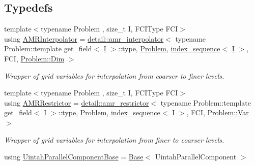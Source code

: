 \subsection*{Typedefs}
\begin{DoxyCompactItemize}
\item 
{\footnotesize template$<$typename Problem , size\+\_\+t I, F\+C\+I\+Type F\+CI$>$ }\\using \hyperlink{namespaceUintah_1_1PhaseField_a2188fd3571014276c1445391573d263d}{A\+M\+R\+Interpolator} = \hyperlink{classUintah_1_1PhaseField_1_1detail_1_1amr__interpolator}{detail\+::amr\+\_\+interpolator}$<$ typename Problem\+::template get\+\_\+field$<$ \hyperlink{structUintah_1_1PhaseField_1_1I}{I} $>$\+::type, \hyperlink{classUintah_1_1PhaseField_1_1Problem}{Problem}, \hyperlink{namespaceUintah_1_1PhaseField_a237de804d99512e50613aff7c94a9461}{index\+\_\+sequence}$<$ \hyperlink{structUintah_1_1PhaseField_1_1I}{I} $>$, F\+CI, \hyperlink{classUintah_1_1PhaseField_1_1Problem_a23dbecf657023dd405fc40939661c550}{Problem\+::\+Dim} $>$
\begin{DoxyCompactList}\small\item\em Wrapper of grid variables for interpolation from coarser to finer levels. \end{DoxyCompactList}\item 
{\footnotesize template$<$typename Problem , size\+\_\+t I, F\+C\+I\+Type F\+CI$>$ }\\using \hyperlink{namespaceUintah_1_1PhaseField_a75763c981a43e822af372ed79bbc54b6}{A\+M\+R\+Restrictor} = \hyperlink{classUintah_1_1PhaseField_1_1detail_1_1amr__restrictor}{detail\+::amr\+\_\+restrictor}$<$ typename Problem\+::template get\+\_\+field$<$ \hyperlink{structUintah_1_1PhaseField_1_1I}{I} $>$\+::type, \hyperlink{classUintah_1_1PhaseField_1_1Problem}{Problem}, \hyperlink{namespaceUintah_1_1PhaseField_a237de804d99512e50613aff7c94a9461}{index\+\_\+sequence}$<$ \hyperlink{structUintah_1_1PhaseField_1_1I}{I} $>$, F\+CI, \hyperlink{classUintah_1_1PhaseField_1_1Problem_a74de1351a682f8523456962f0fc49a18}{Problem\+::\+Var} $>$
\begin{DoxyCompactList}\small\item\em Wrapper of grid variables for interpolation from finer to coarser levels. \end{DoxyCompactList}\item 
using \hyperlink{namespaceUintah_1_1PhaseField_a769cb9d270a04e03ff788b4d16ff6c2b}{Uintah\+Parallel\+Component\+Base} = \hyperlink{classUintah_1_1PhaseField_1_1Base}{Base}$<$ Uintah\+Parallel\+Component $>$

\end{DoxyCompactItemize}
